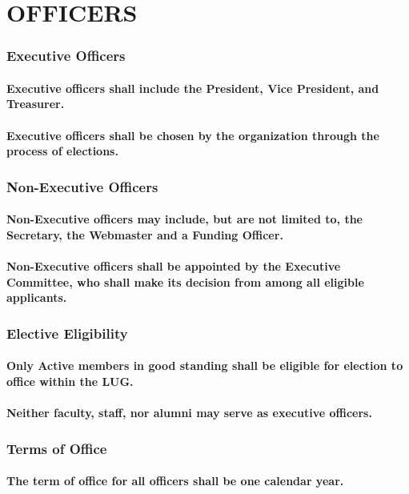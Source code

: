 \documentclass[letter]{report}
\begin{document}
\part{OFFICERS}
\section{Executive Officers}
\subsection{Executive officers shall include the President, Vice President, and Treasurer.}
\subsection{Executive officers shall be chosen by the organization through the process of elections.}
\section{Non-Executive Officers}
\subsection{Non-Executive officers may include, but are not limited to, the Secretary, the Webmaster and a Funding Officer.}
\subsection{Non-Executive officers shall be appointed by the Executive Committee, who shall make its decision from among all eligible applicants.}
\section{Elective Eligibility}
\subsection{Only Active members in good standing shall be eligible for election to office within the LUG.}
\subsection{Neither faculty, staff, nor alumni may serve as executive officers.}
\section{Terms of Office}
\subsection{The term of office for all officers shall be one calendar year.}
\end{document}
